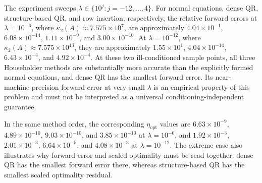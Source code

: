 \noindent The experiment sweeps $\lambda\in\{10^j:j=-12,\ldots,4\}$.
For normal equations, dense QR, structure-based QR, and row insertion,
respectively, the relative forward errors at $\lambda=10^{-6}$, where
$\kappa_2(A)\approx7.575\times10^7$, are approximately
$4.04\times10^{-1}$, $6.08\times10^{-14}$, $1.11\times10^{-9}$, and
$3.00\times10^{-10}$. At
$\lambda=10^{-12}$, where
$\kappa_2(A)\approx7.575\times10^{13}$, they are approximately
$1.55\times10^1$, $4.04\times10^{-14}$, $6.43\times10^{-4}$, and
$4.92\times10^{-4}$. At these two
ill-conditioned sample points, all three Householder methods are substantially more
accurate than the explicitly formed normal equations, and dense QR has the
smallest forward error. Its near-machine-precision forward error at very small
$\lambda$ is an empirical property of this problem and must not be interpreted
as a universal conditioning-independent guarantee.

\noindent In the same method order, the corresponding
$\eta_{\mathrm{opt}}$ values are $6.63\times10^{-9}$,
$4.89\times10^{-10}$, $9.03\times10^{-10}$, and $3.85\times10^{-10}$ at
$\lambda=10^{-6}$, and $1.92\times10^{-3}$, $2.01\times10^{-3}$,
$6.64\times10^{-5}$, and $4.08\times10^{-3}$ at
$\lambda=10^{-12}$. The extreme case also illustrates why forward error and
scaled optimality must be read together: dense QR has the smallest forward
error there, whereas structure-based QR has the smallest scaled optimality
residual.
